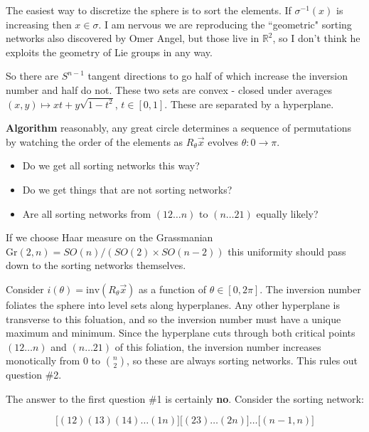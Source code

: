 \documentclass[12pt]{article}
\begin{document}
{\noindent The easiest way to discretize the sphere is to sort the elements.  If $\sigma^{-1}(x) $ is increasing then $x \in \sigma$.  I am nervous we are reproducing the ``geometric" sorting networks also discovered by Omer Angel, but those live in $\mathbb{R}^2$, so I don't think he exploits the geometry of Lie groups in any way. \newline

\noindent So there are $S^{n-1}$ tangent directions to go half of which increase the inversion number and half do not.  These two sets are convex - closed under averages $(x,y)\mapsto xt + y\sqrt{1-t^2}$, $t \in [0,1]$. These are separated by a hyperplane. \newline

\noindent \textbf{Algorithm} reasonably, any great circle determines a sequence of permutations by watching the order of the elements as $R_\theta \vec{x}$ evolves $\theta:0 \to \pi$.  
\begin{itemize}
\item Do we get all sorting networks this way?
\item Do we get things that are not sorting networks?
\item Are all sorting networks from $(12 \dots n)  $ to $(n \dots 2 1 )$ equally likely?
\end{itemize}

\noindent If we choose Haar measure on the Grassmanian $\mathrm{Gr}(2,n) = SO(n) / (SO(2) \times SO(n-2))$ this uniformity should pass down to the sorting networks themselves. \newline

\noindent Consider $i(\theta) = \mathrm{inv}(R_\theta \vec{x})$ as a function of $\theta \in [0,2\pi]$.  The inversion number foliates the sphere into level sets along hyperplanes.  Any other hyperplane is transverse to this foluation, and so the inversion number must have a unique maximum and minimum.  Since the hyperplane cuts through both critical points $(12 \dots n)$ and $(n \dots 21)$ of this foliation, the inversion number increases monotically from $0$ to $\binom{n}{2}$, so these are always sorting networks. This rules out question \#2. \newline 

\noindent The answer to the first question \#1 is certainly \textbf{no}.  Consider the sorting network:

$$ \bigg[(12)(13)(14)\dots (1n)\bigg]\bigg[(23)\dots (2n)\bigg]\dots \bigg[ (n-1,n) \bigg]$$ 

}
\end{document}
